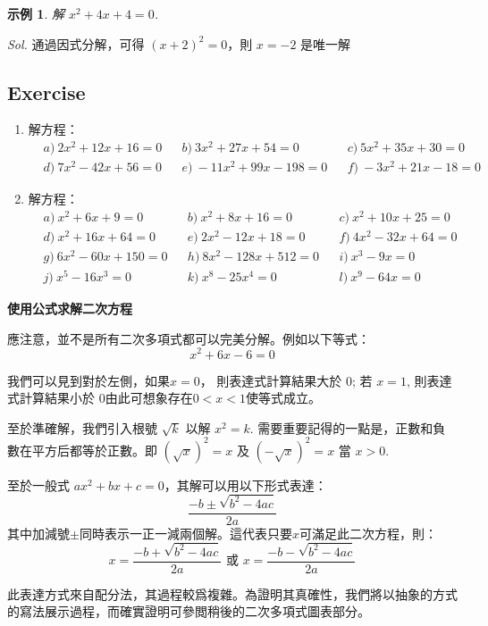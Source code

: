 \documentclass[12pt]{article}
\newtheorem{example}{示例}
\begin{document}
    \begin{example}
        解 $x^2+4x+4=0$.
    \end{example}

    \textit{ Sol. }通過因式分解，可得 $(x+2)^2=0$，則 $x=-2$ 是唯一解

    \subsection*{Exercise}
    \begin{enumerate}
        \item 解方程：\begin{align*}
            &a)\ 2x^2+12x+16=0&&b)\ 3x^2+27x+54=0&&c)\ 5x^2+35x+30=0\\
            &d)\ 7x^2-42x+56=0&&e)\ -11x^2+99x-198=0&&f)\ -3x^2+21x-18=0
        \end{align*}
        \item 解方程：\begin{align*}
            &a)\ x^2+6x+9=0&&b)\ x^2+8x+16=0&&c)\ x^2+10x+25=0\\
            &d)\ x^2+16x+64=0&&e)\ 2x^2-12x+18=0&&f)\ 4x^2-32x+64=0\\
            &g)\ 6x^2-60x+150=0&&h)\ 8x^2-128x+512=0&&i)\ x^3-9x=0\\
            &j)\ x^5-16x^3=0&&k)\ x^8-25x^4=0&&l)\ x^9-64x=0
        \end{align*}
    \end{enumerate}

    \begin{center}
        \textbf{使用公式求解二次方程}
    \end{center}

    應注意，並不是所有二次多項式都可以完美分解。例如以下等式：$$x^2+6x-6=0$$

    我們可以見到對於左側，如果$x=0$， 則表達式計算結果大於 $0$; 若 $x=1$, 則表達式計算結果小於 $0$由此可想象存在$0<x<1$使等式成立。
    
    至於準確解，我們引入根號 $\sqrt{k}$ 以解 $x^2=k$. 需要重要記得的一點是，正數和負數在平方后都等於正數。即 $(\sqrt{x})^2=x$ 及 $(-\sqrt{x})^2=x$ 當 $x>0$.

    至於一般式 $ax^2+bx+c=0$，其解可以用以下形式表達：$$\frac{-b\pm\sqrt{b^2-4ac}}{2a}$$其中加減號$\pm$同時表示一正一減兩個解。這代表只要$x$可滿足此二次方程，則： $$x=\frac{-b+\sqrt{b^2-4ac}}{2a}\textrm{ 或 }x=\frac{-b-\sqrt{b^2-4ac}}{2a}$$ 
    
    此表達方式來自配分法，其過程較爲複雜。為證明其真確性，我們將以抽象的方式的寫法展示過程，而確實證明可參閲稍後的二次多項式圖表部分。
\end{document}
